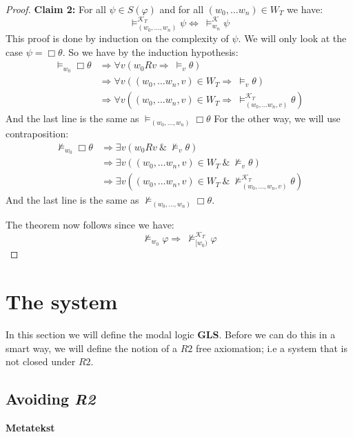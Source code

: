 \documentclass[../main.tex]{subfiles}
\begin{document}
\begin{proof}
	\textbf{Claim 2:} For all $\psi\in S(\varphi)$ and for all $(w_0,\ldots
	w_n)\in W_T$ we have:
	$$\vDash^{\mathcal{K}_T}_{(w_0,\ldots,w_n)}\psi\Leftrightarrow\ \vDash_{w_n}^\mathcal{K}\psi$$
	This proof is done by induction on the complexity of $\psi$. We will
	only look at the case $\psi=\Box\theta$. So we have by the induction
	hypothesis:
	\begin{align*}
		\vDash_{w_0}\Box\theta&\Rightarrow\forall v(w_0Rv\Rightarrow\ 
		\vDash_v\theta)\\
				      &\Rightarrow\forall v((w_0,\ldots
				      w_n,v)\in W_T\Rightarrow\
				      \vDash_v\theta)\\
				      &\Rightarrow\forall v((w_0,\ldots
				      w_n,v)\in W_T\Rightarrow\
				      \vDash_{(w_0,\ldots w_n,v)}^{\mathcal{K}_T}\theta)
	\end{align*}
	And the last line is the same as $\vDash_{(w_0,\ldots,w_n)}\Box\theta$
	For the other way, we will use contraposition:
	\begin{align*}
		\not\vDash_{w_0}\Box\theta&\Rightarrow \exists v(w_0Rv\ \&\
		\not\vDash_v\theta)\\
					  &\Rightarrow\exists v((w_0,\ldots
					  w_n,v)\in W_T\ \&\
					  \not\vDash_v\theta)\\
					  &\Rightarrow\exists v((w_0,\ldots
					  w_n,v)\in W_T\ \&\
					  \not\vDash_{(w_0,\ldots,w_n,v)}^{\mathcal{K}_T}\theta)
	\end{align*}
	And the last line is the same as
	$\not\vDash_{(w_0,\ldots,w_n)}\Box\theta$. 

	The theorem now follows since we have:
	$$\not\vDash_{w_0}\varphi\Rightarrow\
	\not\vDash_{[w_0)}^{\mathcal{K}_T}\varphi$$
\end{proof}
\section{The system }
In this section we will define the modal logic \textbf{GLS}. Before we can do
this in a smart way, we will define the notion of a $R2$ free axiomation; i.e a
system that is not closed under $R2$.

\subsection{Avoiding \textit{R2}}

\textbf{Metatekst}
\end{document}
